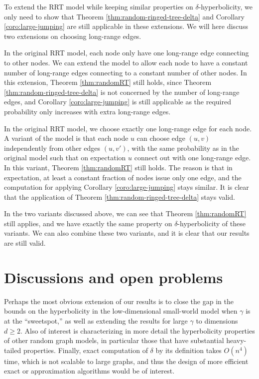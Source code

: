 \documentclass[11pt]{article}
\begin{document}
To extend the RRT model while keeping similar properties on
$\delta$-hyperbolicity, we only need to show that Theorem
\ref{thm:random-ringed-tree-delta} and Corollary
\ref{coro:large-jumping} are still applicable in these extensions. We
will here discuss two extensions on choosing long-range edges.

\vspace{\topsep}

 In the
original RRT model, each node only have one long-range edge
	connecting to other nodes. 
We can extend the model to allow each node to have a constant
	number of long-range edges connecting to a constant number of
	other nodes.  
In this extension, Theorem \ref{thm:randomRT}
still holds, since Theorem \ref{thm:random-ringed-tree-delta} is not
concerned by the number of long-range edges, and Corollary
\ref{coro:large-jumping} is still applicable as the required
probability only increases with extra long-range edges.

\vspace{\topsep}

 In the original RRT model, we
choose exactly one long-range edge for each node. 
A variant of the model is that each node $u$ can choose edge $(u,v)$
	independently from other edges $(u,v')$, with the same probability as
	in the original model such that on expectation $u$ connect out
	with one long-range edge.
In this variant, Theorem \ref{thm:randomRT}
still holds. The reason is that in expectation, at least a constant fraction of nodes issue only one edge, and the
computation for applying Corollary \ref{coro:large-jumping} stays similar. It is clear that the application of Theorem
\ref{thm:random-ringed-tree-delta} stays valid.

\vspace{\topsep}

In the two variants discussed above, we can see that Theorem
\ref{thm:randomRT} still applies, and we have exactly the same
property on $\delta$-hyperbolicity of these variants. We can also
combine these two variants, and it is clear that our results are still
valid.

\section{Discussions and open problems} \label{sec:discuss}

Perhaps the most obvious extension of our results is to close the gap in 
the bounds on the hyperbolicity in the low-dimensional small-world model when 
$\gamma$ is at the ``sweetspot,'' as well as extending the results for 
large $\gamma$ to dimensions $d\ge 2$.  
Also of interest is characterizing in more detail the hyperbolicity 
properties of other random graph models, in particular those that have 
substantial heavy-tailed properties.
Finally, exact computation of $\delta$ by its definition takes $O(n^4)$ time, which is not scalable
	to large graphs, and thus the design of more efficient exact or approximation algorithms
	would be of interest.
\end{document}

